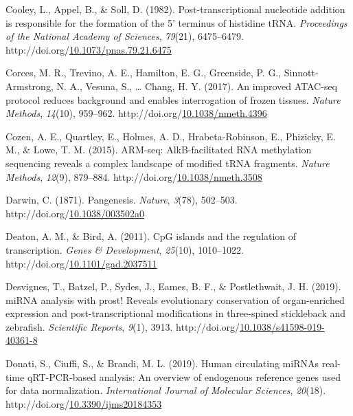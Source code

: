 \documentclass[12pt,twoside]{reedthesis}
\newlength{\cslhangindent}
\newenvironment{CSLReferences}[2] %
 {%
  \setlength{\parindent}{0pt}
  \ifodd #1 \everypar{\setlength{\hangindent}{\cslhangindent}}\ignorespaces\fi
  \ifnum #2 > 0
  \setlength{\parskip}{#2\baselineskip}
  \fi
 }%
 {}
\begin{document}
\begin{CSLReferences}{1}{0}
\leavevmode{}%
Cooley, L., Appel, B., \& Soll, D. (1982). Post-transcriptional nucleotide addition is responsible for the formation of the 5' terminus of histidine tRNA. \emph{Proceedings of the National Academy of Sciences}, \emph{79}(21), 6475--6479. http://doi.org/\href{https://doi.org/10.1073/pnas.79.21.6475}{10.1073/pnas.79.21.6475}

\leavevmode{}%
Corces, M. R., Trevino, A. E., Hamilton, E. G., Greenside, P. G., Sinnott-Armstrong, N. A., Vesuna, S., \ldots{} Chang, H. Y. (2017). An improved ATAC-seq protocol reduces background and enables interrogation of frozen tissues. \emph{Nature Methods}, \emph{14}(10), 959--962. http://doi.org/\href{https://doi.org/10.1038/nmeth.4396}{10.1038/nmeth.4396}

\leavevmode{}%
Cozen, A. E., Quartley, E., Holmes, A. D., Hrabeta-Robinson, E., Phizicky, E. M., \& Lowe, T. M. (2015). ARM-seq: AlkB-facilitated RNA methylation sequencing reveals a complex landscape of modified tRNA fragments. \emph{Nature Methods}, \emph{12}(9), 879--884. http://doi.org/\href{https://doi.org/10.1038/nmeth.3508}{10.1038/nmeth.3508}

\leavevmode{}%
Darwin, C. (1871). Pangenesis. \emph{Nature}, \emph{3}(78), 502--503. http://doi.org/\href{https://doi.org/10.1038/003502a0}{10.1038/003502a0}

\leavevmode{}%
Deaton, A. M., \& Bird, A. (2011). CpG islands and the regulation of transcription. \emph{Genes \& Development}, \emph{25}(10), 1010--1022. http://doi.org/\href{https://doi.org/10.1101/gad.2037511}{10.1101/gad.2037511}

\leavevmode{}%
Desvignes, T., Batzel, P., Sydes, J., Eames, B. F., \& Postlethwait, J. H. (2019). miRNA analysis with prost! Reveals evolutionary conservation of organ-enriched expression and post-transcriptional modifications in three-spined stickleback and zebrafish. \emph{Scientific Reports}, \emph{9}(1), 3913. http://doi.org/\href{https://doi.org/10.1038/s41598-019-40361-8}{10.1038/s41598-019-40361-8}

\leavevmode{}%
Donati, S., Ciuffi, S., \& Brandi, M. L. (2019). Human circulating miRNAs real-time qRT-PCR-based analysis: An overview of endogenous reference genes used for data normalization. \emph{International Journal of Molecular Sciences}, \emph{20}(18). http://doi.org/\href{https://doi.org/10.3390/ijms20184353}{10.3390/ijms20184353}


\end{CSLReferences}
\end{document}
